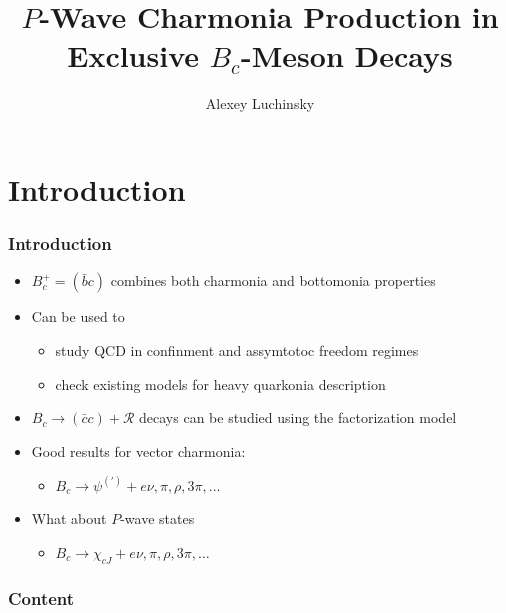 \documentclass{beamer}
\title{$P$-Wave Charmonia Production in Exclusive $B_c$-Meson Decays}
\author{Alexey Luchinsky}
\institute{IHEP, Russia\\ BGSU, Bowling Green, OH, USA}
\newcommand{\R}{\mathcal{R}}
\newcommand{\cc}{(\bar{c}c)}
\begin{document}
\begin{frame}
  \maketitle
\end{frame}

\section{Introduction}
\begin{frame}
  \frametitle{Introduction}
  \begin{itemize}
  \item $B_c^+ = (\bar{b}c)$ combines both charmonia and bottomonia properties
  \item Can be used to
    \begin{itemize}
    \item study QCD in confinment and assymtotoc freedom regimes
    \item check existing models for heavy quarkonia description      
    \end{itemize}
  \item $B_c \to \cc+\R$ decays can be studied using the factorization model
  \item Good results for vector charmonia:
    \begin{itemize}
    \item $B_c \to \psi^{(')} + e\nu, \pi, \rho, 3\pi, \dots$
    \end{itemize}
  \item What about $P$-wave states
    \begin{itemize}
    \item $B_c \to \chi_{cJ} + e\nu, \pi, \rho, 3\pi, \dots$
    \end{itemize}

  \end{itemize}
\end{frame}

\begin{frame}
  \frametitle{Content}
  \tableofcontents
\end{frame}
\end{document}

